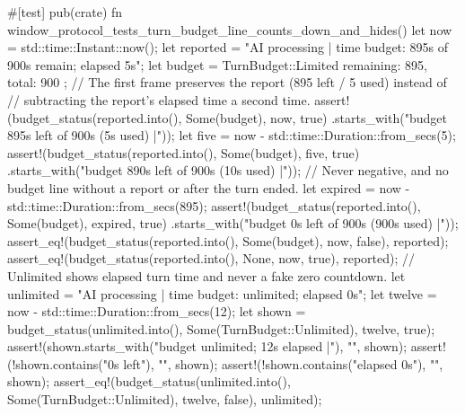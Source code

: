 {{{{    #[test]
    pub(crate) fn window_protocol_tests_turn_budget_line_counts_down_and_hides() {
        let now = std::time::Instant::now();
        let reported = "AI processing | time budget: 895s of 900s remain; elapsed 5s";
        let budget = TurnBudget::Limited { remaining: 895, total: 900 };
        // The first frame preserves the report (895 left / 5 used) instead of
        // subtracting the report's elapsed time a second time.
        assert!(budget_status(reported.into(), Some(budget), now, true)
            .starts_with("budget 895s left of 900s (5s used) |"));
        let five = now - std::time::Duration::from_secs(5);
        assert!(budget_status(reported.into(), Some(budget), five, true)
            .starts_with("budget 890s left of 900s (10s used) |"));
        // Never negative, and no budget line without a report or after the turn ended.
        let expired = now - std::time::Duration::from_secs(895);
        assert!(budget_status(reported.into(), Some(budget), expired, true)
            .starts_with("budget 0s left of 900s (900s used) |"));
        assert_eq!(budget_status(reported.into(), Some(budget), now, false), reported);
        assert_eq!(budget_status(reported.into(), None, now, true), reported);
        // Unlimited shows elapsed turn time and never a fake zero countdown.
        let unlimited = "AI processing | time budget: unlimited; elapsed 0s";
        let twelve = now - std::time::Duration::from_secs(12);
        let shown = budget_status(unlimited.into(), Some(TurnBudget::Unlimited), twelve, true);
        assert!(shown.starts_with("budget unlimited; 12s elapsed |"), "{}", shown);
        assert!(!shown.contains("0s left"), "{}", shown);
        assert!(!shown.contains("elapsed 0s"), "{}", shown);
        assert_eq!(budget_status(unlimited.into(), Some(TurnBudget::Unlimited), twelve, false), unlimited);
    }

}}}}
